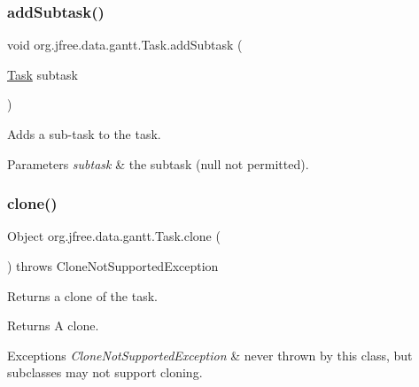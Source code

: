 \subsubsection{\texorpdfstring{add\+Subtask()}{addSubtask()}}
{\footnotesize\ttfamily void org.\+jfree.\+data.\+gantt.\+Task.\+add\+Subtask (\begin{DoxyParamCaption}\item[{\mbox{\hyperlink{classorg_1_1jfree_1_1data_1_1gantt_1_1_task}{Task}}}]{subtask }\end{DoxyParamCaption})}

Adds a sub-\/task to the task.


\begin{DoxyParams}{Parameters}
{\em subtask} & the subtask ({\ttfamily null} not permitted). \\
\hline
\end{DoxyParams}
\mbox{\label{classorg_1_1jfree_1_1data_1_1gantt_1_1_task_a04808ca5a58846b9a21f6d8bf7cbf3a7}} 
\subsubsection{\texorpdfstring{clone()}{clone()}}
{\footnotesize\ttfamily Object org.\+jfree.\+data.\+gantt.\+Task.\+clone (\begin{DoxyParamCaption}{ }\end{DoxyParamCaption}) throws Clone\+Not\+Supported\+Exception}

Returns a clone of the task.

\begin{DoxyReturn}{Returns}
A clone.
\end{DoxyReturn}

\begin{DoxyExceptions}{Exceptions}
{\em Clone\+Not\+Supported\+Exception} & never thrown by this class, but subclasses may not support cloning. \\
\hline
\end{DoxyExceptions}
\mbox{\label{classorg_1_1jfree_1_1data_1_1gantt_1_1_task_a184c6853b7b17afce298836701f0dcd3}} 
